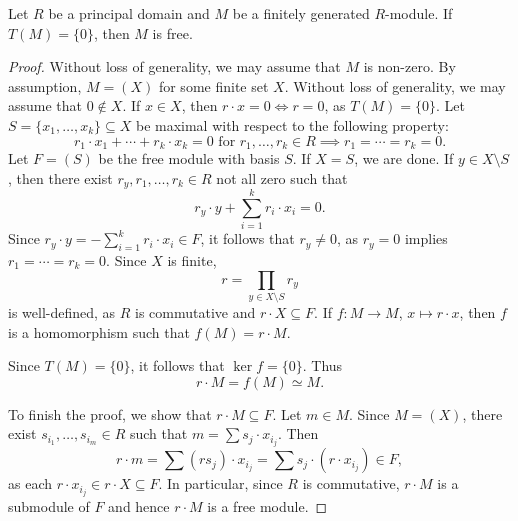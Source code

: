 \begin{theorem}
Let $R$ be a principal domain and 
$M$ be a finitely generated $R$-module. If
$T(M)=\{0\}$, then $M$ is free. 
\end{theorem}

\begin{proof}
Without loss of generality, we may assume that $M$ is non-zero.
By assumption, $M=(X)$ for some finite set $X$. Without loss of generality, we may assume that $0\not\in X$. 
If $x\in X$, then $r\cdot x=0\Longleftrightarrow r=0$, as $T(M)=\{0\}$. 
Let $S=\{x_1,\dots,x_k\}\subseteq X$ 
be maximal with respect to the following property:
\[
r_1\cdot x_1+\cdots+r_k\cdot x_k=0\text{ for $r_1,\dots,r_k\in R$}\implies r_1=\cdots=r_k=0.
\]	
Let $F=(S)$ be the free module with basis $S$. If $X=S$, we are done. 
If $y\in X\setminus S$, then
there exist $r_y,r_1,\dots,r_k\in R$ not all zero such that 
\[
r_y\cdot y+\sum_{i=1}^k r_i\cdot x_i=0.
\]
Since $r_y\cdot y=-\sum_{i=1}^k r_i\cdot x_i\in F$, it follows that
$r_y\ne 0$, as  
$r_y=0$ implies $r_1=\cdots=r_k=0$. Since $X$ is finite, 
\[
r=\prod_{y\in X\setminus S}r_y
\]
is well-defined, as $R$ is commutative and 
$r\cdot X\subseteq F$. If $f\colon M\to M$, $x\mapsto r\cdot x$, then
$f$ is a homomorphism such that $f(M)=r\cdot M$.

Since $T(M)=\{0\}$, it follows that
$\ker f=\{0\}$. Thus 
\[
r\cdot M=f(M)\simeq M.
\]

To finish the proof, we show that $r\cdot M\subseteq F$. Let $m\in M$. Since $M=(X)$, there exist $s_{i_1},\dots,s_{i_m}\in R$
such that 
$m=\sum s_j\cdot x_{i_j}$. Then 
\[
r\cdot m=\sum (rs_{j})\cdot x_{i_j}=\sum s_{j}\cdot (r\cdot x_{i_j})\in F,
\]
as each $r\cdot x_{i_j}\in r\cdot X\subseteq F$. In particular, since 
$R$ is commutative, $r\cdot M$ is a submodule of $F$ and hence $r\cdot M$ is a free module.  
\end{proof}



